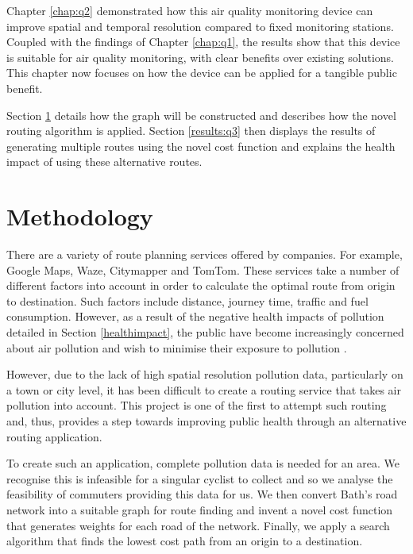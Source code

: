 \documentclass[11pt]{report}
\begin{document}
Chapter \ref{chap:q2} demonstrated how this air quality monitoring device can improve spatial and temporal resolution compared to fixed monitoring stations. Coupled with the findings of Chapter \ref{chap:q1}, the results show that this device is suitable for air quality monitoring, with clear benefits over existing solutions. This chapter now focuses on how the device can be applied for a tangible public benefit.

Section \ref{meth:q3} details how the graph will be constructed and describes how the novel routing algorithm is applied. Section \ref{results:q3} then displays the results of generating multiple routes using the novel cost function and explains the health impact of using these alternative routes.

\section{Methodology} \label{meth:q3}

There are a variety of route planning services offered by companies. For example, Google Maps, Waze, Citymapper and TomTom. These services take a number of different factors into account in order to calculate the optimal route from origin to destination. Such factors include distance, journey time, traffic and fuel consumption. However, as a result of the negative health impacts of pollution detailed in Section \ref{healthimpact}, the public have become increasingly concerned about air pollution and wish to minimise their exposure to pollution \citep{hartog2010health}.

However, due to the lack of high spatial resolution pollution data, particularly on a town or city level, it has been difficult to create a routing service that takes air pollution into account. This project is one of the first to attempt such routing \citep{sharker2014exposureroutes, Hasenfratz2015highresmapsTram} and, thus, provides a step towards improving public health through an alternative routing application.

To create such an application, complete pollution data is needed for an area. We recognise this is infeasible for a singular cyclist to collect and so we analyse the feasibility of commuters providing this data for us. We then convert Bath's road network into a suitable graph for route finding and invent a novel cost function that generates weights for each road of the network. Finally, we apply a search algorithm that finds the lowest cost path from an origin to a destination. 
\end{document}
